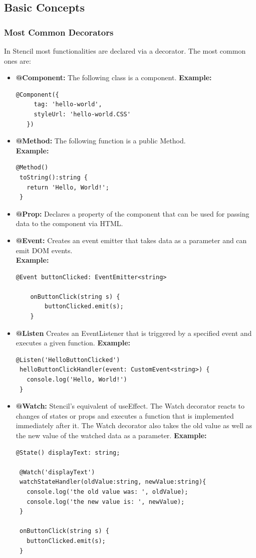 \subsection{Basic Concepts}
\subsubsection{Most Common Decorators}
In Stencil most functionalities are declared via a decorator. The most common ones are:
\begin{itemize}
\item \textbf{@Component:} The following class is a component.
\textbf{Example:}
\begin{Verbatim}[frame=single]
   @Component({
     tag: 'hello-world',
     styleUrl: 'hello-world.CSS'	
   })
\end{Verbatim}
\item \textbf{@Method:} The following function is a public Method.\\
\textbf{Example:}
\begin{Verbatim}[frame=single]
 @Method()
 toString():string {
   return 'Hello, World!';
 }
\end{Verbatim}
\item \textbf{@Prop:} Declares a property of the component that can be used for passing data to the component via HTML.
\item \textbf{@Event:} Creates an event emitter that takes data as a parameter and can emit DOM events.\\
\textbf{Example:}
\begin{Verbatim}[frame=single]
	@Event buttonClicked: EventEmitter<string>
	
	onButtonClick(string s) {
		buttonClicked.emit(s);
	}
\end{Verbatim}
\item \textbf{@Listen} Creates an EventListener that is triggered by a specified event and executes a given function.
\textbf{Example:}
\begin{Verbatim}[frame=single]
 @Listen('HelloButtonClicked') 	
 helloButtonClickHandler(event: CustomEvent<string>) {
   console.log('Hello, World!')
 }
\end{Verbatim}
\item \textbf{@Watch:} Stencil's equivalent of useEffect. The Watch decorator reacts to changes of states or props and executes a function that is implemented immediately after it. The Watch decorator also takes the old value as well as the new value of the watched data as a parameter.
\textbf{Example:}
\begin{Verbatim}[frame=single]
 @State() displayText: string;
 
 @Watch('displayText')
 watchStateHandler(oldValue:string, newValue:string){
   console.log('the old value was: ', oldValue);
   console.log('the new value is: ', newValue);
 }

 onButtonClick(string s) {
   buttonClicked.emit(s);
 }
\end{Verbatim}
\end{itemize}



